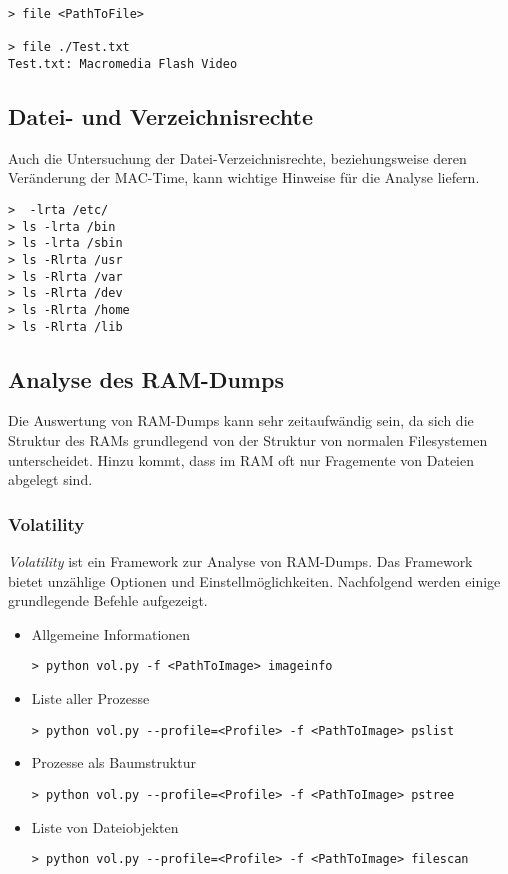 \begin{lstlisting}
> file <PathToFile>

> file ./Test.txt
Test.txt: Macromedia Flash Video
\end{lstlisting}

\subsection{Datei- und Verzeichnisrechte}
Auch die Untersuchung der Datei-Verzeichnisrechte, beziehungsweise deren Veränderung der MAC-Time, kann wichtige Hinweise für die Analyse liefern.

\begin{lstlisting}
>  -lrta /etc/
> ls -lrta /bin
> ls -lrta /sbin
> ls -Rlrta /usr
> ls -Rlrta /var
> ls -Rlrta /dev
> ls -Rlrta /home
> ls -Rlrta /lib
\end{lstlisting}

\subsection{Analyse des RAM-Dumps}
Die Auswertung von RAM-Dumps kann sehr zeitaufwändig sein, da sich die Struktur des RAMs grundlegend von der Struktur von normalen Filesystemen unterscheidet. Hinzu kommt, dass im RAM oft nur Fragemente von Dateien abgelegt sind.

\subsubsection{Volatility}
\textit{Volatility} ist ein Framework zur Analyse von RAM-Dumps. Das Framework bietet unzählige Optionen und Einstellmöglichkeiten. Nachfolgend werden einige grundlegende Befehle aufgezeigt.

\begin{itemize}
\item Allgemeine Informationen
\begin{lstlisting}
> python vol.py -f <PathToImage> imageinfo
\end{lstlisting}

\item Liste aller Prozesse
\begin{lstlisting}
> python vol.py --profile=<Profile> -f <PathToImage> pslist
\end{lstlisting}

\item Prozesse als Baumstruktur
\begin{lstlisting}
> python vol.py --profile=<Profile> -f <PathToImage> pstree
\end{lstlisting}

\item Liste von Dateiobjekten
\begin{lstlisting}
> python vol.py --profile=<Profile> -f <PathToImage> filescan
\end{lstlisting}

\end{itemize}

